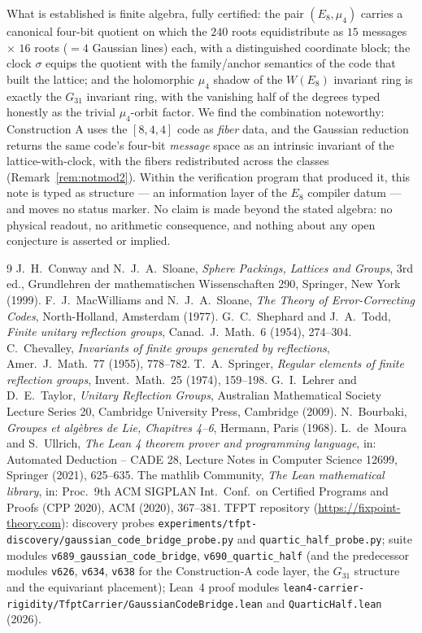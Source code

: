 \documentclass[11pt,a4paper]{article}
\theoremstyle{remark}
\begin{document}
What is established is finite algebra, fully certified: the pair
$(E_8,\mu_4)$ carries a canonical four-bit quotient on which the
$240$ roots equidistribute as $15$ messages $\times$ $16$ roots
(${}=4$ Gaussian lines) each, with a distinguished coordinate block;
the clock $\sigma$ equips the quotient with the family/anchor
semantics of the code that built the lattice; and the holomorphic
$\mu_4$ shadow of the $W(E_8)$ invariant ring is exactly the
$G_{31}$ invariant ring, with the vanishing half of the degrees typed
honestly as the trivial $\mu_4$-orbit factor.  We find the
combination noteworthy: Construction A uses the $[8,4,4]$ code as
\emph{fiber} data, and the Gaussian reduction returns the same code's
four-bit \emph{message} space as an intrinsic invariant of the
lattice-with-clock, with the fibers redistributed across the classes
(Remark~\ref{rem:notmod2}).  Within the verification program that
produced it, this note is typed as structure --- an information layer
of the $E_8$ compiler datum --- and moves no status marker.  No claim
is made beyond the stated algebra: no physical readout, no arithmetic
consequence, and nothing about any open conjecture is asserted or
implied.

\small
\begin{thebibliography}{9}
 J.~H.~Conway and N.~J.~A.~Sloane,
\emph{Sphere Packings, Lattices and Groups}, 3rd ed.,
Grundlehren der mathematischen Wissenschaften 290, Springer, New York
(1999).
 F.~J.~MacWilliams and N.~J.~A.~Sloane,
\emph{The Theory of Error-Correcting Codes}, North-Holland,
Amsterdam (1977).
 G.~C.~Shephard and J.~A.~Todd,
\emph{Finite unitary reflection groups},
Canad.\ J.\ Math.\ 6 (1954), 274--304.
 C.~Chevalley,
\emph{Invariants of finite groups generated by reflections},
Amer.\ J.\ Math.\ 77 (1955), 778--782.
 T.~A.~Springer,
\emph{Regular elements of finite reflection groups},
Invent.\ Math.\ 25 (1974), 159--198.
 G.~I.~Lehrer and D.~E.~Taylor,
\emph{Unitary Reflection Groups}, Australian Mathematical Society
Lecture Series 20, Cambridge University Press, Cambridge (2009).
 N.~Bourbaki,
\emph{Groupes et alg\`ebres de Lie, Chapitres 4--6},
Hermann, Paris (1968).
 L.~de~Moura and S.~Ullrich,
\emph{The Lean 4 theorem prover and programming language},
in: Automated Deduction -- CADE 28, Lecture Notes in Computer
Science 12699, Springer (2021), 625--635.
 The mathlib Community,
\emph{The Lean mathematical library},
in: Proc.\ 9th ACM SIGPLAN Int.\ Conf.\ on Certified Programs and
Proofs (CPP 2020), ACM (2020), 367--381.
 TFPT repository
(\url{https://fixpoint-theory.com}): discovery probes
\texttt{experiments/tfpt-discovery/gaussian\_code\_bridge\_probe.py}
and \texttt{quartic\_half\_probe.py}; suite modules
\texttt{v689\_gaussian\_code\_bridge},
\texttt{v690\_quartic\_half} (and the predecessor modules
\texttt{v626}, \texttt{v634}, \texttt{v638} for the Construction-A
code layer, the $G_{31}$ structure and the equivariant placement);
Lean~4 proof modules
\texttt{lean4-carrier-rigidity/TfptCarrier/GaussianCodeBridge.lean}
and \texttt{QuarticHalf.lean} (2026).
\end{thebibliography}
\end{document}
